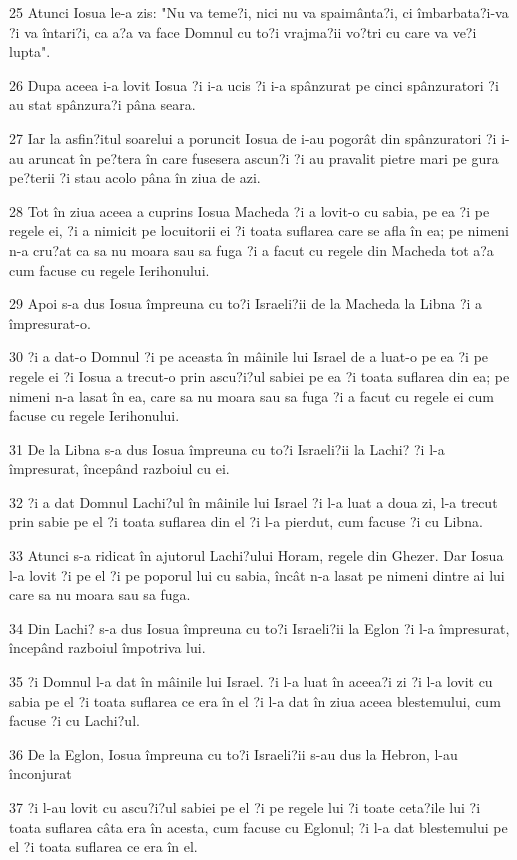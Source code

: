 \par 25 Atunci Iosua le-a zis: "Nu va teme?i, nici nu va spaimânta?i, ci îmbarbata?i-va ?i va întari?i, ca a?a va face Domnul cu to?i vrajma?ii vo?tri cu care va ve?i lupta".
\par 26 Dupa aceea i-a lovit Iosua ?i i-a ucis ?i i-a spânzurat pe cinci spânzuratori ?i au stat spânzura?i pâna seara.
\par 27 Iar la asfin?itul soarelui a poruncit Iosua de i-au pogorât din spânzuratori ?i i-au aruncat în pe?tera în care fusesera ascun?i ?i au pravalit pietre mari pe gura pe?terii ?i stau acolo pâna în ziua de azi.
\par 28 Tot în ziua aceea a cuprins Iosua Macheda ?i a lovit-o cu sabia, pe ea ?i pe regele ei, ?i a nimicit pe locuitorii ei ?i toata suflarea care se afla în ea; pe nimeni n-a cru?at ca sa nu moara sau sa fuga ?i a facut cu regele din Macheda tot a?a cum facuse cu regele Ierihonului.
\par 29 Apoi s-a dus Iosua împreuna cu to?i Israeli?ii de la Macheda la Libna ?i a împresurat-o.
\par 30 ?i a dat-o Domnul ?i pe aceasta în mâinile lui Israel de a luat-o pe ea ?i pe regele ei ?i Iosua a trecut-o prin ascu?i?ul sabiei pe ea ?i toata suflarea din ea; pe nimeni n-a lasat în ea, care sa nu moara sau sa fuga ?i a facut cu regele ei cum facuse cu regele Ierihonului.
\par 31 De la Libna s-a dus Iosua împreuna cu to?i Israeli?ii la Lachi? ?i l-a împresurat, începând razboiul cu ei.
\par 32 ?i a dat Domnul Lachi?ul în mâinile lui Israel ?i l-a luat a doua zi, l-a trecut prin sabie pe el ?i toata suflarea din el ?i l-a pierdut, cum facuse ?i cu Libna.
\par 33 Atunci s-a ridicat în ajutorul Lachi?ului Horam, regele din Ghezer. Dar Iosua l-a lovit ?i pe el ?i pe poporul lui cu sabia, încât n-a lasat pe nimeni dintre ai lui care sa nu moara sau sa fuga.
\par 34 Din Lachi? s-a dus Iosua împreuna cu to?i Israeli?ii la Eglon ?i l-a împresurat, începând razboiul împotriva lui.
\par 35 ?i Domnul l-a dat în mâinile lui Israel. ?i l-a luat în aceea?i zi ?i l-a lovit cu sabia pe el ?i toata suflarea ce era în el ?i l-a dat în ziua aceea blestemului, cum facuse ?i cu Lachi?ul.
\par 36 De la Eglon, Iosua împreuna cu to?i Israeli?ii s-au dus la Hebron, l-au înconjurat
\par 37 ?i l-au lovit cu ascu?i?ul sabiei pe el ?i pe regele lui ?i toate ceta?ile lui ?i toata suflarea câta era în acesta, cum facuse cu Eglonul; ?i l-a dat blestemului pe el ?i toata suflarea ce era în el.
